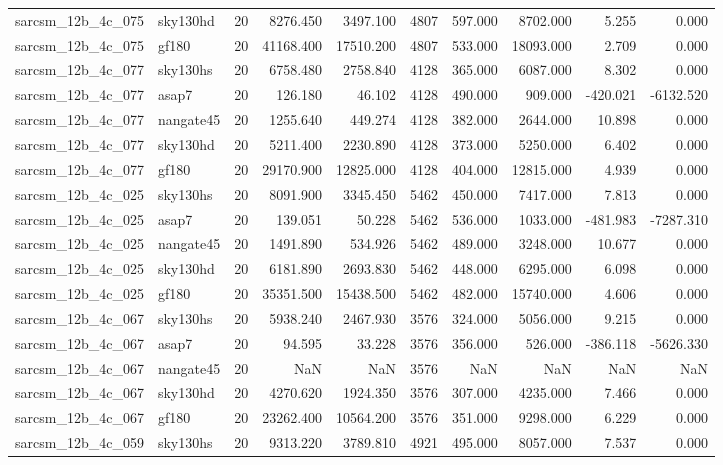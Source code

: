 \begin{longtable}{llrrrrrrrr}
sarcsm\_12b\_4c\_075 & sky130hd & 20 & 8276.450 & 3497.100 & 4807 & 597.000 & 8702.000 & 5.255 & 0.000 \\
sarcsm\_12b\_4c\_075 & gf180 & 20 & 41168.400 & 17510.200 & 4807 & 533.000 & 18093.000 & 2.709 & 0.000 \\
sarcsm\_12b\_4c\_077 & sky130hs & 20 & 6758.480 & 2758.840 & 4128 & 365.000 & 6087.000 & 8.302 & 0.000 \\
sarcsm\_12b\_4c\_077 & asap7 & 20 & 126.180 & 46.102 & 4128 & 490.000 & 909.000 & -420.021 & -6132.520 \\
sarcsm\_12b\_4c\_077 & nangate45 & 20 & 1255.640 & 449.274 & 4128 & 382.000 & 2644.000 & 10.898 & 0.000 \\
sarcsm\_12b\_4c\_077 & sky130hd & 20 & 5211.400 & 2230.890 & 4128 & 373.000 & 5250.000 & 6.402 & 0.000 \\
sarcsm\_12b\_4c\_077 & gf180 & 20 & 29170.900 & 12825.000 & 4128 & 404.000 & 12815.000 & 4.939 & 0.000 \\
sarcsm\_12b\_4c\_025 & sky130hs & 20 & 8091.900 & 3345.450 & 5462 & 450.000 & 7417.000 & 7.813 & 0.000 \\
sarcsm\_12b\_4c\_025 & asap7 & 20 & 139.051 & 50.228 & 5462 & 536.000 & 1033.000 & -481.983 & -7287.310 \\
sarcsm\_12b\_4c\_025 & nangate45 & 20 & 1491.890 & 534.926 & 5462 & 489.000 & 3248.000 & 10.677 & 0.000 \\
sarcsm\_12b\_4c\_025 & sky130hd & 20 & 6181.890 & 2693.830 & 5462 & 448.000 & 6295.000 & 6.098 & 0.000 \\
sarcsm\_12b\_4c\_025 & gf180 & 20 & 35351.500 & 15438.500 & 5462 & 482.000 & 15740.000 & 4.606 & 0.000 \\
sarcsm\_12b\_4c\_067 & sky130hs & 20 & 5938.240 & 2467.930 & 3576 & 324.000 & 5056.000 & 9.215 & 0.000 \\
sarcsm\_12b\_4c\_067 & asap7 & 20 & 94.595 & 33.228 & 3576 & 356.000 & 526.000 & -386.118 & -5626.330 \\
sarcsm\_12b\_4c\_067 & nangate45 & 20 & NaN & NaN & 3576 & NaN & NaN & NaN & NaN \\
sarcsm\_12b\_4c\_067 & sky130hd & 20 & 4270.620 & 1924.350 & 3576 & 307.000 & 4235.000 & 7.466 & 0.000 \\
sarcsm\_12b\_4c\_067 & gf180 & 20 & 23262.400 & 10564.200 & 3576 & 351.000 & 9298.000 & 6.229 & 0.000 \\
sarcsm\_12b\_4c\_059 & sky130hs & 20 & 9313.220 & 3789.810 & 4921 & 495.000 & 8057.000 & 7.537 & 0.000 \\

\end{longtable}
